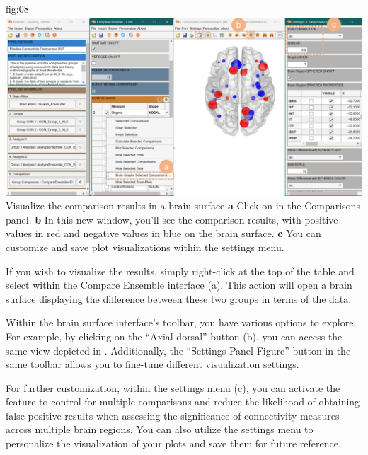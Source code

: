 \documentclass[justified]{tufte-handout}
\begin{document}
	{fig:08}
	{
	\includegraphics{fig08.jpg}
	}
	{Visualize the comparison results in a brain surface}
	{
	{\bf a} Click on  in the Comparisons panel.
	{\bf b} In this new window, you'll see the comparison results, with positive values in red and negative values in blue on the brain surface.
{\bf c} You can customize and save plot visualizations within the settings menu.
	}

If you wish to visualize the results, simply right-click at the top of the table and select  within the Compare Ensemble interface (a). This action will open a brain surface displaying the difference between these two groups in terms of the  data.

Within the brain surface interface's toolbar, you have various options to explore. For example, by clicking on the “Axial dorsal” button (b), you can access the same view depicted in . Additionally, the “Settings Panel Figure” button in the same toolbar allows you to fine-tune different visualization settings.

For further customization, within the settings menu (c), you can activate the  feature to control for multiple comparisons and reduce the likelihood of obtaining false positive results when assessing the significance of connectivity measures across multiple brain regions. You can also utilize the settings menu to personalize the visualization of your plots and save them for future reference.
\end{document}

